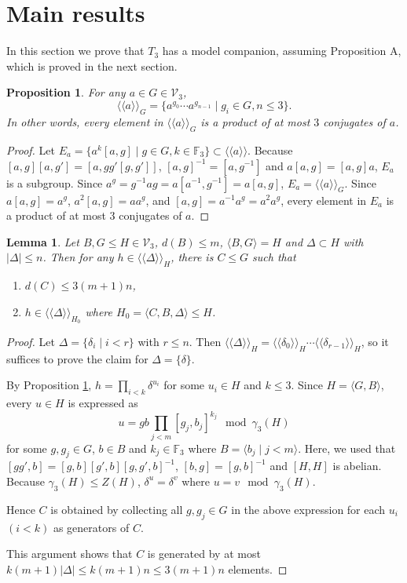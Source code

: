 \documentclass[11pt,reqno]{article}
\newtheorem{lemma}[theorem]{Lemma}
\newtheorem{proposition}[theorem]{Proposition}
\theoremstyle{definition}
\theoremstyle{remark}
\newcommand{\llangle}{\langle\!\langle}
\newcommand{\rrangle}{\rangle\!\rangle}
\begin{document}
\section{Main results}
\label{sec:main-results}
In this section we prove that $T_3$ has a model companion, assuming Proposition A, which is proved in the next section.


\begin{proposition}\label{proposition:bounded number of conjugates}
    For any $a\in G\in \mathcal V_3$,
    \[
    \llangle a\rrangle_G = \{a^{g_0}\cdots a^{g_{n-1}}\mid g_i\in G, n\leq 3\}.    
    \]
    In other words, every element in $\llangle a\rrangle_G$ is a product of at most $3$ conjugates of $a$. 
\end{proposition}
\begin{proof}
Let $E_a=\{a^k[a,g]\mid g\in G, k\in\mathbb F_3\}\subset \llangle a\rrangle$.
Because $[a,g][a,g']=[a,gg'[g,g']]$, $[a,g]^{-1}=[a,g^{-1}]$ and $a[a,g]=[a,g]a$, $E_a$ is a subgroup.
Since $a^g=g^{-1}ag=a[a^{-1},g^{-1}]=a[a,g]$, $E_a=\llangle a\rrangle_G$.
Since $a[a,g]=a^g$, $a^2[a,g]=aa^g$, and $[a,g]=a^{-1}a^g=a^2a^g$, every element in $E_a$ is a product of at most $3$ conjugates of $a$.
\end{proof}


\begin{lemma}\label{lemma:witness in bdd support}
    Let $B,G\leq H\in \mathcal V_3$, $d(B)\leq m$, $\langle B,G\rangle = H$ and $\Delta\subset H$ with $|\Delta|\leq n$.
    Then for any $h\in \llangle \Delta \rrangle_H$,
    there is $C\leq G$ such that
    \begin{enumerate}
        \item $d(C)\leq 3(m+1)n$,
        \item $h\in \llangle \Delta \rrangle_{H_0}$ where $H_0=\langle C,B,\Delta\rangle\leq H$.
    \end{enumerate}
    
\end{lemma}
\begin{proof}
Let $\Delta=\{\delta_i\mid i<r\}$ with $r\leq n$. Then $\llangle \Delta \rrangle_H=\llangle \delta_0\rrangle_H\cdots\llangle\delta_{r-1}\rrangle_H$, so it suffices to prove the claim for $\Delta=\{\delta\}$.

By Proposition \ref{proposition:bounded number of conjugates}, $h=\prod_{i<k}\delta^{u_i}$ for some $u_i\in H$ and $k\leq 3$.
Since $H=\langle G,B\rangle$, every $u\in H$ is expressed as
\[
    u = gb\prod_{j<m}[g_j,b_j]^{k_j} \mod \gamma_3(H)
    \]
for some $g,g_j\in G$, $b\in B$ and $k_j\in \mathbb F_3$ where $B=\langle b_j\mid j<m\rangle$.
Here, we used that $[gg',b]=[g,b][g',b][g,g',b]^{-1}$, $[b,g]=[g,b]^{-1}$ and $[H,H]$ is abelian.
Because $\gamma_3(H)\leq Z(H)$, $\delta^u=\delta^v$ where $u=v \mod\gamma_3(H)$.

Hence $C$ is obtained by collecting all $g,g_j\in G$ in the above expression for each $u_i$ $(i<k)$ as generators of $C$.

This argument shows that $C$ is generated by at most $k(m+1)|\Delta|\leq k(m+1)n\leq 3(m+1)n$ elements.
\end{proof}
\end{document}
